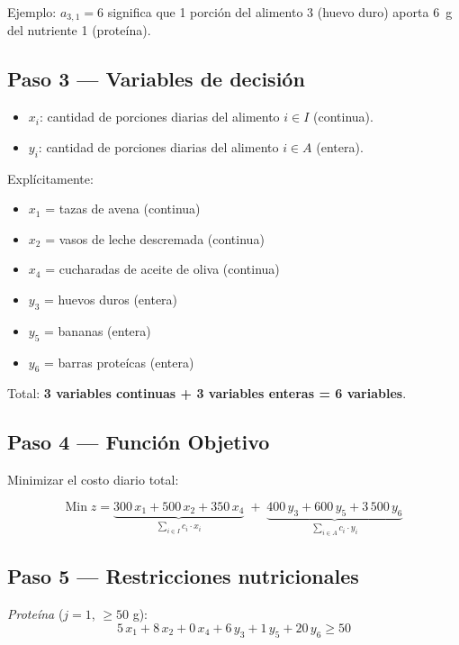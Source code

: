 \documentclass[12pt]{article}
\begin{document}
Ejemplo: $a_{3,1} = 6$ significa que 1 porci\'on del alimento 3 (huevo duro) aporta 6~g del nutriente 1 (prote\'ina).

\subsection{Paso 3 --- Variables de decisi\'on}

\begin{cajazul}
\begin{itemize}
    \item $x_i$: cantidad de porciones diarias del alimento $i \in I$ (continua).
    \item $y_i$: cantidad de porciones diarias del alimento $i \in A$ (entera).
\end{itemize}

Expl\'icitamente:
\begin{itemize}
    \item $x_1$ = tazas de avena (continua)
    \item $x_2$ = vasos de leche descremada (continua)
    \item $x_4$ = cucharadas de aceite de oliva (continua)
    \item $y_3$ = huevos duros (entera)
    \item $y_5$ = bananas (entera)
    \item $y_6$ = barras prote\'icas (entera)
\end{itemize}
\end{cajazul}

Total: \textbf{3 variables continuas + 3 variables enteras = 6 variables}.

\subsection{Paso 4 --- Funci\'on Objetivo}

Minimizar el costo diario total:

\[
    \text{Min}\; z = \underbrace{300\,x_1 + 500\,x_2 + 350\,x_4}_{\sum_{i \in I} c_i \cdot x_i}
    \;+\; \underbrace{400\,y_3 + 600\,y_5 + 3\,500\,y_6}_{\sum_{i \in A} c_i \cdot y_i}
\]

\subsection{Paso 5 --- Restricciones nutricionales}

\textit{Prote\'ina} ($j = 1$, $\geq 50$ g):
\[
    5\,x_1 + 8\,x_2 + 0\,x_4 + 6\,y_3 + 1\,y_5 + 20\,y_6 \geq 50
\]
\end{document}
